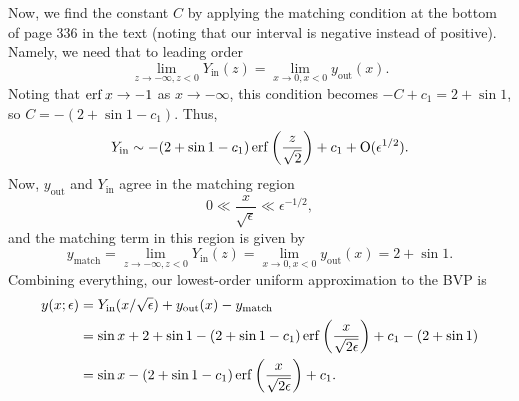 \documentclass{article}
\begin{document}
Now, we find the constant $C$ by applying the matching condition at the bottom of page 336 in the text (noting that our interval is negative instead of positive). Namely, we need that to leading order
\[
\lim_{z\to-\infty,z<0}Y_{\text{in}}(z)=\lim_{x\to0,x<0}y_{\text{out}}(x).
\]
Noting that $\operatorname{erf} x\to-1$ as $x\to-\infty$, this condition becomes $-C+c_1=2+\sin1$, so $C=-(2+\sin1-c_1)$. Thus, 
\[
Y_{\text{in}}\sim -(2+\sin1-c_1)\operatorname{erf}\left(\frac{z}{\sqrt{2}}\right)+c_1+\operatorname{O}(\epsilon^{1/2}).
\]
Now, $y_{\text{out}}$ and $Y_{\text{in}}$ agree in the matching region 
\[
0\ll\frac{x}{\sqrt{\epsilon}}\ll\epsilon^{-1/2},
\]
and the matching term in this region is given by 
\[
{y}_{\text{match}}=\lim_{z\to-\infty,z<0}Y_{\text{in}}(z)=\lim_{x\to0,x<0}y_{\text{out}}(x)=2+\sin1.
\]
Combining everything, our lowest-order uniform approximation to the BVP is
\begin{align*}
y(x;\epsilon)&=Y_{\text{in}}(x/\sqrt{\epsilon})+y_{\text{out}}(x)-y_{\text{match}}\\&=\sin x+2+\sin1-(2+\sin1-c_1)\operatorname{erf}\left(\frac{x}{\sqrt{2\epsilon}}\right)+c_1-(2+\sin1)\\&=
\sin x-(2+\sin1-c_1)\operatorname{erf}\left(\frac{x}{\sqrt{2\epsilon}}\right)+c_1.
\end{align*}
\end{document}
